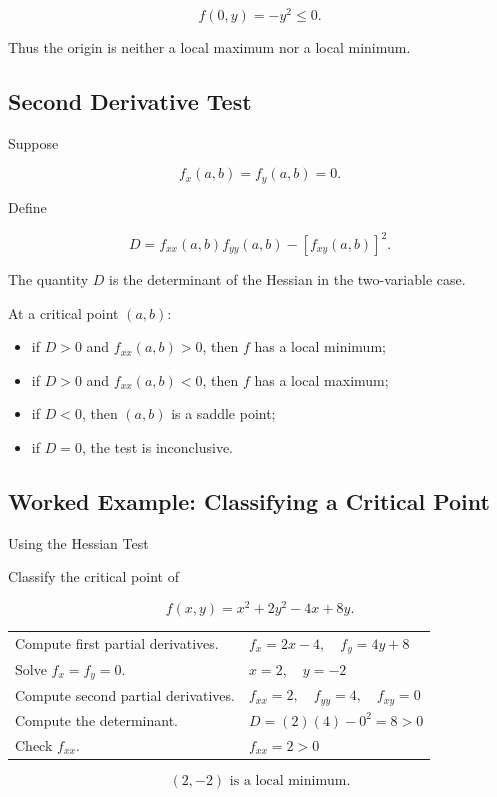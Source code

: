 \[ f(0,y)=-y^2\leq0. \]

Thus the origin is neither a local maximum nor a local minimum.

\subsection{Second Derivative Test}
\label{subsec:multivariable-second-derivative-test}

Suppose

\[ f_x(a,b)=f_y(a,b)=0. \]

Define

\[ D=f_{xx}(a,b)f_{yy}(a,b)-[f_{xy}(a,b)]^2. \]

The quantity \(D\) is the determinant of the Hessian in the two-variable
case.

\begin{theorem}
At a critical point \((a,b)\):
\begin{itemize}
    \item if \(D>0\) and \(f_{xx}(a,b)>0\), then \(f\) has a local minimum;
    \item if \(D>0\) and \(f_{xx}(a,b)<0\), then \(f\) has a local maximum;
    \item if \(D<0\), then \((a,b)\) is a saddle point;
    \item if \(D=0\), the test is inconclusive.
\end{itemize}
\end{theorem}

\subsection{Worked Example: Classifying a Critical Point}
\label{subsec:worked-critical-classification}

\begin{workedexamplebox}{Using the Hessian Test}

Classify the critical point of

\[ f(x,y)=x^2+2y^2-4x+8y. \]

\begin{tabularx}{\textwidth}{@{}>{\raggedright\arraybackslash}p{}X@{}}
Compute first partial derivatives. &
\(f_x=2x-4,\quad f_y=4y+8\)\\
Solve \(f_x=f_y=0\). &
\(x=2,\quad y=-2\)\\
Compute second partial derivatives. &
\(f_{xx}=2,\quad f_{yy}=4,\quad f_{xy}=0\)\\
Compute the determinant. &
\(D=(2)(4)-0^2=8>0\)\\
Check \(f_{xx}\). &
\(f_{xx}=2>0\)
\end{tabularx}

\begin{answerbox}
\[ \boxed{(2,-2)\text{ is a local minimum.}} \]
\end{answerbox}
\end{workedexamplebox}

